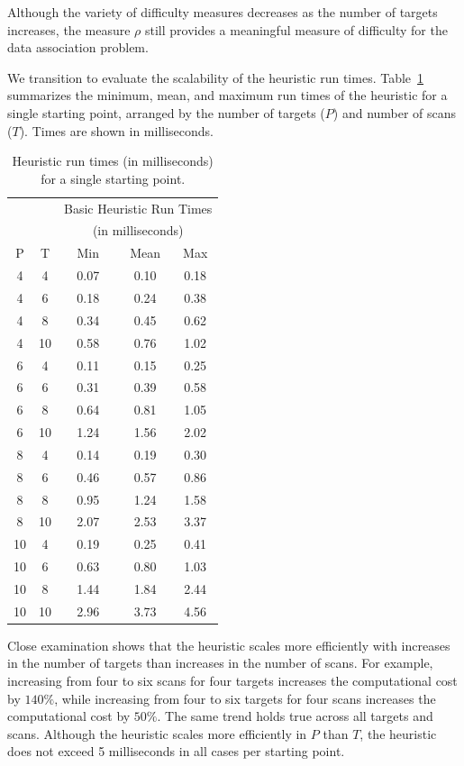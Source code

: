  Although the variety of difficulty measures decreases as the number of targets increases, the measure $\rho$ still provides a meaningful measure of difficulty for the data association problem. 

We transition to evaluate the scalability of the heuristic run times. Table~\ref{tab:Basic_heuristic_times} summarizes the minimum, mean, and maximum run times of the heuristic for a single starting point, arranged by the number of targets ($P$) and number of scans ($T$). Times are shown in milliseconds. 

\begin{table}[ht]
\centering
\begin{tabular}{cc|ccc}
  \hline
   & & \multicolumn{3}{c}{Basic Heuristic Run Times } \\
   & & \multicolumn{3}{c}{(in milliseconds)}\\
   P & T & $\;\;$Min$\;\;$ & Mean & Max \\ 
  \hline
  \hline
   4 & 4 & 0.07 & 0.10 & 0.18 \\ 
   4 & 6 & 0.18 & 0.24 & 0.38 \\ 
   4 & 8 & 0.34 & 0.45 & 0.62 \\ 
   4 & 10 & 0.58 & 0.76 & 1.02 \\ 
   6 & 4 & 0.11 & 0.15 & 0.25 \\ 
   6 & 6 & 0.31 & 0.39 & 0.58 \\ 
   6 & 8 & 0.64 & 0.81 & 1.05 \\ 
   6 & 10 & 1.24 & 1.56 & 2.02 \\ 
   8 & 4 & 0.14 & 0.19 & 0.30 \\ 
   8 & 6 & 0.46 & 0.57 & 0.86 \\ 
   8 & 8 & 0.95 & 1.24 & 1.58 \\ 
   8 & 10 & 2.07 & 2.53 & 3.37 \\ 
   10 & 4 & 0.19 & 0.25 & 0.41 \\ 
   10 & 6 & 0.63 & 0.80 & 1.03 \\ 
   10 & 8 & 1.44 & 1.84 & 2.44 \\ 
   10 & 10 & 2.96 & 3.73 & 4.56 \\ 
   \hline
\end{tabular}
\caption{Heuristic run times (in milliseconds) for a single starting point.}
\label{tab:Basic_heuristic_times}
\end{table}

Close examination shows that the heuristic scales more efficiently with increases in the number of targets than increases in the number of scans. For example, increasing from four to six scans for four targets increases the computational cost by $140\%$, while increasing from four to six targets for four scans increases the computational cost by $50\%$. The same trend holds true across all targets and scans. Although the heuristic scales more efficiently in $P$ than $T$, the heuristic does not exceed 5 milliseconds in all cases per starting point.

